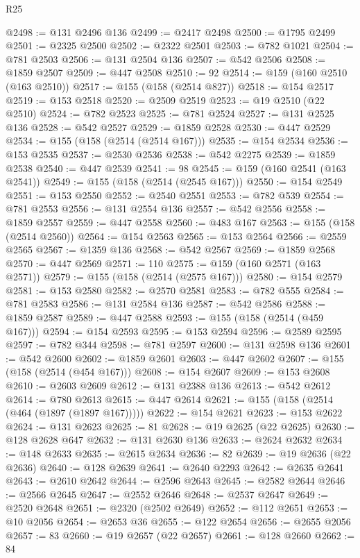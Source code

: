 \begin{lexlean}{R25}
\begin{coremodule}
@2498 := @131 @2496 @136
@2499 := @2417 @2498
@2500 := @1795 @2499
@2501 := @2325 @2500
@2502 := @2322 @2501
@2503 := @782 @1021
@2504 := @781 @2503
@2506 := @131 @2504 @136
@2507 := @542 @2506
@2508 := @1859 @2507
@2509 := @447 @2508
@2510 := 92
@2514 := @159 (@160 @2510 (@163 @2510))
@2517 := @155 (@158 (@2514 @827))
@2518 := @154 @2517
@2519 := @153 @2518
@2520 := @2509 @2519
@2523 := @19 @2510 (@22 @2510)
@2524 := @782 @2523
@2525 := @781 @2524
@2527 := @131 @2525 @136
@2528 := @542 @2527
@2529 := @1859 @2528
@2530 := @447 @2529
@2534 := @155 (@158 (@2514 (@2514 @167)))
@2535 := @154 @2534
@2536 := @153 @2535
@2537 := @2530 @2536
@2538 := @542 @2275
@2539 := @1859 @2538
@2540 := @447 @2539
@2541 := 98
@2545 := @159 (@160 @2541 (@163 @2541))
@2549 := @155 (@158 (@2514 (@2545 @167)))
@2550 := @154 @2549
@2551 := @153 @2550
@2552 := @2540 @2551
@2553 := @782 @539
@2554 := @781 @2553
@2556 := @131 @2554 @136
@2557 := @542 @2556
@2558 := @1859 @2557
@2559 := @447 @2558
@2560 := @483 @167
@2563 := @155 (@158 (@2514 @2560))
@2564 := @154 @2563
@2565 := @153 @2564
@2566 := @2559 @2565
@2567 := @1359 @136
@2568 := @542 @2567
@2569 := @1859 @2568
@2570 := @447 @2569
@2571 := 110
@2575 := @159 (@160 @2571 (@163 @2571))
@2579 := @155 (@158 (@2514 (@2575 @167)))
@2580 := @154 @2579
@2581 := @153 @2580
@2582 := @2570 @2581
@2583 := @782 @555
@2584 := @781 @2583
@2586 := @131 @2584 @136
@2587 := @542 @2586
@2588 := @1859 @2587
@2589 := @447 @2588
@2593 := @155 (@158 (@2514 (@459 @167)))
@2594 := @154 @2593
@2595 := @153 @2594
@2596 := @2589 @2595
@2597 := @782 @344
@2598 := @781 @2597
@2600 := @131 @2598 @136
@2601 := @542 @2600
@2602 := @1859 @2601
@2603 := @447 @2602
@2607 := @155 (@158 (@2514 (@454 @167)))
@2608 := @154 @2607
@2609 := @153 @2608
@2610 := @2603 @2609
@2612 := @131 @2388 @136
@2613 := @542 @2612
@2614 := @780 @2613
@2615 := @447 @2614
@2621 := @155 (@158 (@2514 (@464 (@1897 (@1897 @167)))))
@2622 := @154 @2621
@2623 := @153 @2622
@2624 := @131 @2623
@2625 := 81
@2628 := @19 @2625 (@22 @2625)
@2630 := @128 @2628 @647
@2632 := @131 @2630 @136
@2633 := @2624 @2632
@2634 := @148 @2633
@2635 := @2615 @2634
@2636 := 82
@2639 := @19 @2636 (@22 @2636)
@2640 := @128 @2639
@2641 := @2640 @2293
@2642 := @2635 @2641
@2643 := @2610 @2642
@2644 := @2596 @2643
@2645 := @2582 @2644
@2646 := @2566 @2645
@2647 := @2552 @2646
@2648 := @2537 @2647
@2649 := @2520 @2648
@2651 := @2320 (@2502 @2649)
@2652 := @112 @2651
@2653 := @10 @2056
@2654 := @2653 @36
@2655 := @122 @2654
@2656 := @2655 @2056
@2657 := 83
@2660 := @19 @2657 (@22 @2657)
@2661 := @128 @2660
@2662 := 84

\end{coremodule}
\end{lexlean}

